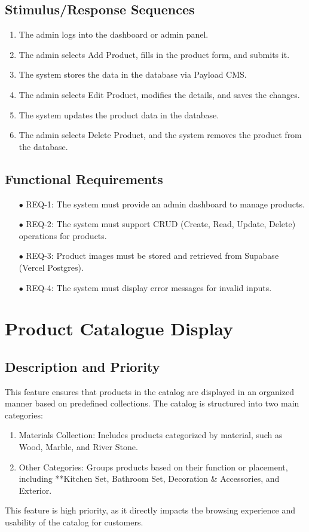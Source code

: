 \documentclass[oneside,a4paper,12pt,explicit]{book}
\begin{document}
\subsection{Stimulus/Response Sequences}
\begin{enumerate}
    \item The admin logs into the dashboard or admin panel.
    \item The admin selects Add Product, fills in the product form, and submits it.
    \item The system stores the data in the database via Payload CMS.
    \item The admin selects Edit Product, modifies the details, and saves the changes.
    \item The system updates the product data in the database.
    \item The admin selects Delete Product, and the system removes the product from the database.
\end{enumerate}

\subsection{Functional Requirements}
\begin{enumerate}
    \item[$\bullet$] REQ-1: The system must provide an admin dashboard to manage products.
    \item[$\bullet$] REQ-2: The system must support CRUD (Create, Read, Update, Delete) operations for products.
    \item[$\bullet$] REQ-3: Product images must be stored and retrieved from Supabase (Vercel Postgres).
    \item[$\bullet$] REQ-4: The system must display error messages for invalid inputs.
\end{enumerate}

\section{Product Catalogue Display}

\subsection{Description and Priority}
This feature ensures that products in the catalog are displayed in an organized manner based on predefined collections. The catalog is structured into two main categories:
\begin{enumerate}
    \item Materials Collection: Includes products categorized by material, such as Wood, Marble, and River Stone.
    \item Other Categories: Groups products based on their function or placement, including **Kitchen Set, Bathroom Set, Decoration & Accessories, and Exterior.
\end{enumerate}
This feature is high priority, as it directly impacts the browsing experience and usability of the catalog for customers.
\end{document}

